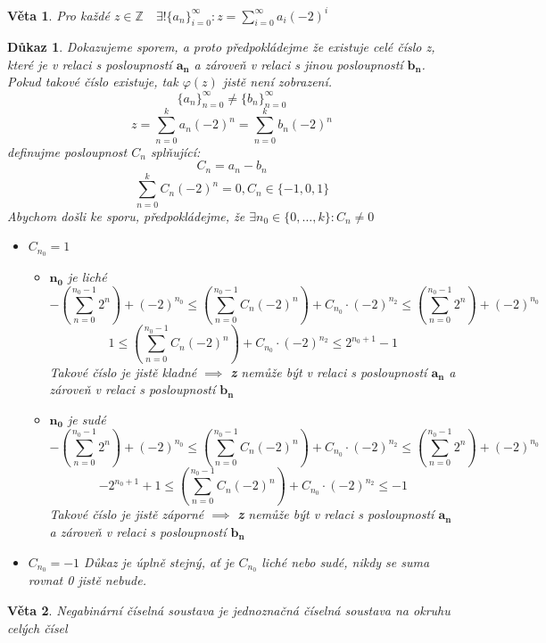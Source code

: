 \documentclass[12pt]{book}
\newtheorem{veta}{Věta}
\newtheorem*{dukaz}{Důkaz}
\begin{document}
\begin{veta}
	Pro každé $z\in\mathbb{Z}\quad\exists!\{a_n\}_{i=0}^\infty:z=\sum_{i=0}^{\infty}a_i(-2)^i$
\end{veta}
\begin{dukaz}
	Dokazujeme sporem, a proto předpokládejme že existuje celé číslo z, které je v relaci s posloupností $\mathbf{a_n}$ a zároveň v relaci s jinou posloupností $\mathbf{b_n}$. Pokud takové číslo existuje, tak $\varphi(z)$ jistě není zobrazení.
	$$\{a_n\}_{n=0}^\infty \ne \{b_n\}_{n=0}^\infty$$ $$z=\sum_{n=0}^{k}a_n(-2)^n = \sum_{n=0}^{k}b_n(-2)^n$$
	definujme posloupnost $C_n$ splňující: $$C_n = a_n - b_n$$
	$$\sum_{n=0}^k C_n(-2)^n = 0 , C_n \in \{-1, 0 ,1\}$$
	Abychom došli ke sporu, předpokládejme, že $\exists n_0 \in \{0,\dots,k\}: C_n \ne 0$
	\begin{itemize}
		\item[$\alpha)$]$C_{n_0} = 1$
		\begin{itemize}
			\item[I.)] $\mathbf{n_0}$ je liché
			$$-\left(\sum_{n=0}^{n_0-1}2^n\right)+(-2)^{n_0}\leq \left(\sum_{n=0}^{n_0-1}C_n(-2)^n\right)+C_{n_0}\cdot(-2)^{n_2}  \leq\left(\sum_{n=0}^{n_0-1}2^n\right)+(-2)^{n_0}$$
			$$1\leq \left(\sum_{n=0}^{n_0-1}C_n(-2)^n\right)+C_{n_0}\cdot(-2)^{n_2}  \leq 2^{n_0 + 1}-1$$
			Takové číslo je jistě kladné $\implies$ \textbf{z} nemůže být v relaci s posloupností $\mathbf{a_n}$ a zároveň v relaci s posloupností $\mathbf{b_n}$
			\item[II.)]  $\mathbf{n_0}$ je sudé
			$$-\left(\sum_{n=0}^{n_0-1}2^n\right)+(-2)^{n_0}\leq \left(\sum_{n=0}^{n_0-1}C_n(-2)^n\right)+C_{n_0}\cdot(-2)^{n_2}  \leq\left(\sum_{n=0}^{n_0-1}2^n\right)+(-2)^{n_0}$$
			$$-2^{n_0+1}+1\leq \left(\sum_{n=0}^{n_0-1}C_n(-2)^n\right)+C_{n_0}\cdot(-2)^{n_2}  \leq -1$$
			Takové číslo je jistě záporné $\implies$ \textbf{z} nemůže být v relaci s posloupností $\mathbf{a_n}$ a zároveň v relaci s posloupností $\mathbf{b_n}$
			
		\end{itemize}
		\item[$\beta)$]$C_{n_0} = -1$\newline
		Důkaz je úplně stejný, ať je $C_{n_0}$ liché nebo sudé, nikdy se suma rovnat 0 jistě nebude.
	\end{itemize}
	
\end{dukaz}

\begin{veta}
	Negabinární číselná soustava je jednoznačná číselná soustava na okruhu celých čísel
\end{veta}
\end{document}
